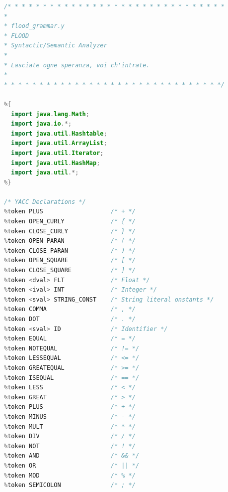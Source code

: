 \documentclass[12pt]{report}
\begin{document}
\begin{singlespace}
\begin{lstlisting}[language=Java,label=some-code,caption={flood$\_$grammar.y}]
/* * * * * * * * * * * * * * * * * * * * * * * * * * * * * * *
*
* flood_grammar.y
* FLOOD
* Syntactic/Semantic Analyzer
*
* Lasciate ogne speranza, voi ch'intrate.
*
* * * * * * * * * * * * * * * * * * * * * * * * * * * * * * */

%{
  import java.lang.Math;
  import java.io.*;
  import java.util.Hashtable;
  import java.util.ArrayList;
  import java.util.Iterator;
  import java.util.HashMap;
  import java.util.*;
%}

/* YACC Declarations */
%token PLUS                   /* + */
%token OPEN_CURLY             /* { */ 
%token CLOSE_CURLY            /* } */
%token OPEN_PARAN             /* ( */
%token CLOSE_PARAN            /* ) */
%token OPEN_SQUARE            /* [ */
%token CLOSE_SQUARE           /* ] */
%token <dval> FLT             /* Float */
%token <ival> INT             /* Integer */
%token <sval> STRING_CONST    /* String literal onstants */
%token COMMA                  /* , */
%token DOT                    /* . */
%token <sval> ID              /* Identifier */
%token EQUAL                  /* = */
%token NOTEQUAL               /* != */
%token LESSEQUAL              /* <= */
%token GREATEQUAL             /* >= */
%token ISEQUAL                /* == */
%token LESS                   /* < */
%token GREAT                  /* > */
%token PLUS                   /* + */
%token MINUS                  /* - */
%token MULT                   /* * */
%token DIV                    /* / */
%token NOT                    /* ! */
%token AND                    /* && */
%token OR                     /* || */
%token MOD                    /* % */
%token SEMICOLON              /* ; */


\end{lstlisting}
\end{singlespace}
\end{document}
